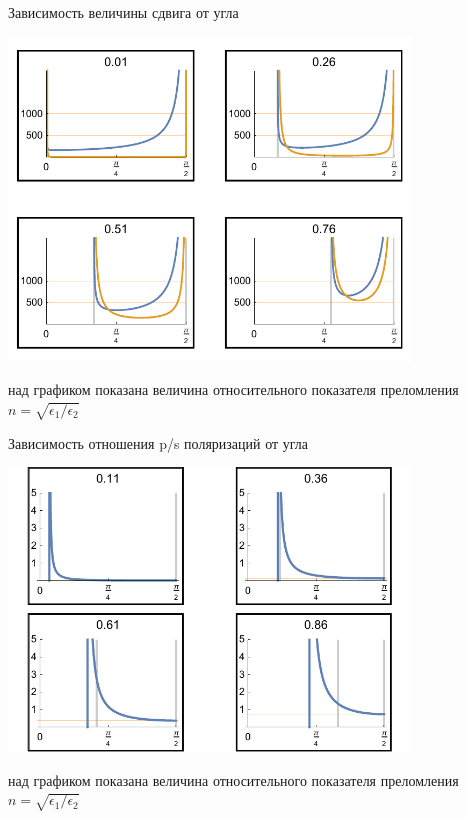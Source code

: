 \documentclass[9pt, compress, xcolor=table]{beamer}
\begin{document}
\begin{frame}{Зависимость величины сдвига от угла}
\begin{center}
\includegraphics[width=0.8\textwidth]{gh}

над графиком показана величина относительного показателя преломления $n=\sqrt{\epsilon_1/\epsilon_2}$
\end{center}
\end{frame}
\begin{frame}{Зависимость отношения p/s поляризаций от угла}
\begin{center}
\includegraphics[width=0.8\textwidth]{gh1}

над графиком показана величина относительного показателя преломления $n=\sqrt{\epsilon_1/\epsilon_2}$
\end{center}
\end{frame}
\end{document}
